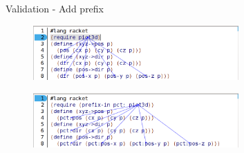 \documentclass[xcolor=dvipsnames, 14pt]{beamer}
\begin{document}
\begin{frame}{Validation - Add prefix}
\begin{figure}[htbp]
  \centering
  \includegraphics[width=0.7\textwidth]{img/add-prefixV2-1.png}
  \label{fig:AddPrefixBefore}
\end{figure}
\begin{figure}[htbp]
  \centering
  \includegraphics[width=0.7\textwidth]{img/add-prefixV2-3.png}
  \label{fig:AddPrefixAfter}
\end{figure}
\end{frame}
\end{document}
